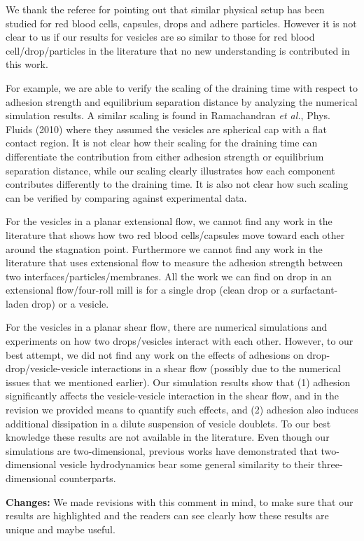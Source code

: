 \documentclass[11pt]{article}
\begin{document}
\begin{enumerate}
\begin{itemize}
 We thank the referee for pointing out that similar physical setup has been studied for red blood cells, capsules, drops and adhere particles. However it is not clear to us if our results for vesicles are so similar to those for red blood cell/drop/particles in the literature that no new understanding is contributed in this work.
  
For example, we are able to verify the scaling of the draining time with respect to adhesion strength and equilibrium separation distance by analyzing the numerical simulation results. 
A similar scaling is found in Ramachandran {\it et al.}, Phys. Fluids (2010) where they assumed the vesicles are spherical cap with a flat contact region. It is not clear how their scaling for the draining time can differentiate the contribution from either adhesion strength or equilibrium separation distance, while our scaling clearly illustrates how each component contributes differently to the draining time. It is also not clear how such scaling can be verified by comparing against experimental data.

For the vesicles in a planar extensional flow, we cannot find any work in the literature that shows how two red blood cells/capsules move toward each other around the stagnation point. Furthermore we cannot find any work in the literature that uses extensional flow to measure the adhesion strength between two interfaces/particles/membranes. All the work we can find on drop in an extensional flow/four-roll mill is for a single drop (clean drop or a surfactant-laden drop) or a vesicle.

For the vesicles in a planar shear flow, there are numerical simulations and experiments on how two drops/vesicles interact with each other. 
However, to our best attempt, we did not find any work on the effects of adhesions on drop-drop/vesicle-vesicle interactions in a shear flow (possibly due to the numerical issues that we mentioned earlier). Our simulation results show that (1) adhesion significantly affects the vesicle-vesicle interaction in the shear flow, and in the revision we provided means to quantify such effects, and (2) adhesion also induces additional dissipation in a dilute suspension of vesicle doublets. To our best knowledge these results are not available in the literature. Even though our simulations are two-dimensional, previous works have demonstrated that two-dimensional vesicle hydrodynamics bear some general similarity to their three-dimensional counterparts. 

{\bf Changes:} We made revisions with this comment in mind, to make sure that our results are highlighted and the readers can see clearly how these results are unique and maybe useful.
  

\end{itemize}
\end{enumerate}
\end{document}
